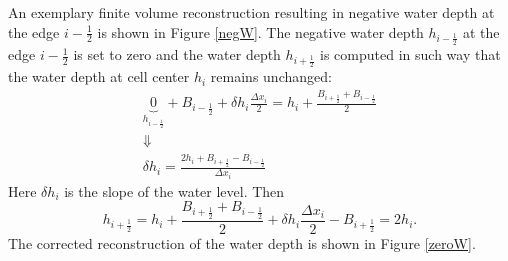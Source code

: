  An exemplary finite volume reconstruction resulting in negative water depth 
at the edge $i-\frac12$ is shown in Figure \ref{negW}. The negative 
water depth $h_{i-\frac12}$ at the edge $i-\frac12$ is set to zero and the water 
depth $h_{i+\frac12}$ is computed in such way that the water depth at cell center 
$h_i$ remains unchanged:
\begin{equation}
\begin{array}{c}
\underbrace{0}_{h_{i-\frac12}}+B_{i-\frac12}+\delta h_i \frac{\Delta x_i}{2}=
h_i+\frac{B_{i+\frac12}+B_{i-\frac12}}{2}\\
\Downarrow\\
\delta h_i=\frac{2h_i+B_{i+\frac12}-B_{i-\frac12}}{\Delta x_i}
\end{array}
\end{equation}
Here $\delta h_i$ is the slope of the water level. Then 
\begin{equation}
h_{i+\frac12}=h_i+\frac{B_{i+\frac12}+B_{i-\frac12}}{2}+
\delta h_i \frac{\Delta x_i}{2}-B_{i+\frac12}=2h_i.
\end{equation}
The corrected reconstruction of the water depth is shown in 
Figure \ref{zeroW}.
